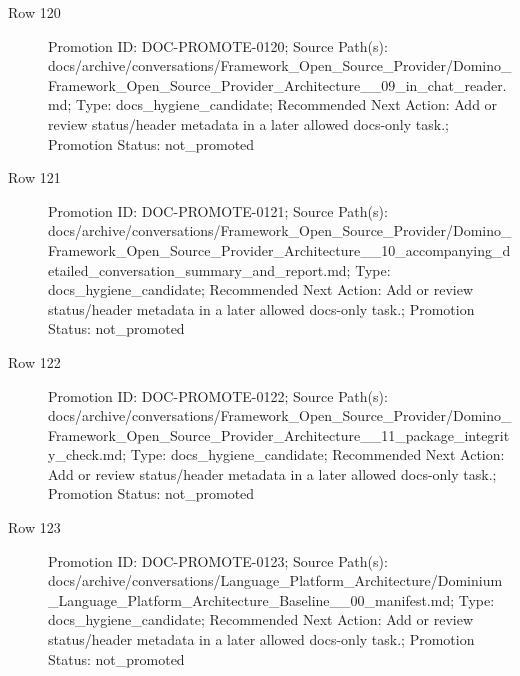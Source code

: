 \documentclass[9pt,a4paper,openany]{book}
\begin{document}
\begin{description}
\item[Row 120] Promotion ID: DOC-\allowbreak{}PROMOTE-\allowbreak{}0120; Source Path(s): docs/\allowbreak{}archive/\allowbreak{}conversations/\allowbreak{}Framework\_\allowbreak{}Open\_\allowbreak{}Source\_\allowbreak{}Provider/\allowbreak{}Domino\_\allowbreak{}Framework\_\allowbreak{}Open\_\allowbreak{}Source\_\allowbreak{}Provider\_\allowbreak{}Architecture\_\allowbreak{}\_\allowbreak{}09\_\allowbreak{}in\_\allowbreak{}chat\_\allowbreak{}reader.\allowbreak{}md; Type: docs\_\allowbreak{}hygiene\_\allowbreak{}candidate; Recommended Next Action: Add or review status/\allowbreak{}header metadata in a later allowed docs-\allowbreak{}only task.\allowbreak{}; Promotion Status: not\_\allowbreak{}promoted
\item[Row 121] Promotion ID: DOC-\allowbreak{}PROMOTE-\allowbreak{}0121; Source Path(s): docs/\allowbreak{}archive/\allowbreak{}conversations/\allowbreak{}Framework\_\allowbreak{}Open\_\allowbreak{}Source\_\allowbreak{}Provider/\allowbreak{}Domino\_\allowbreak{}Framework\_\allowbreak{}Open\_\allowbreak{}Source\_\allowbreak{}Provider\_\allowbreak{}Architecture\_\allowbreak{}\_\allowbreak{}10\_\allowbreak{}accompanying\_\allowbreak{}detailed\_\allowbreak{}conversation\_\allowbreak{}summary\_\allowbreak{}and\_\allowbreak{}report.\allowbreak{}md; Type: docs\_\allowbreak{}hygiene\_\allowbreak{}candidate; Recommended Next Action: Add or review status/\allowbreak{}header metadata in a later allowed docs-\allowbreak{}only task.\allowbreak{}; Promotion Status: not\_\allowbreak{}promoted
\item[Row 122] Promotion ID: DOC-\allowbreak{}PROMOTE-\allowbreak{}0122; Source Path(s): docs/\allowbreak{}archive/\allowbreak{}conversations/\allowbreak{}Framework\_\allowbreak{}Open\_\allowbreak{}Source\_\allowbreak{}Provider/\allowbreak{}Domino\_\allowbreak{}Framework\_\allowbreak{}Open\_\allowbreak{}Source\_\allowbreak{}Provider\_\allowbreak{}Architecture\_\allowbreak{}\_\allowbreak{}11\_\allowbreak{}package\_\allowbreak{}integrity\_\allowbreak{}check.\allowbreak{}md; Type: docs\_\allowbreak{}hygiene\_\allowbreak{}candidate; Recommended Next Action: Add or review status/\allowbreak{}header metadata in a later allowed docs-\allowbreak{}only task.\allowbreak{}; Promotion Status: not\_\allowbreak{}promoted
\item[Row 123] Promotion ID: DOC-\allowbreak{}PROMOTE-\allowbreak{}0123; Source Path(s): docs/\allowbreak{}archive/\allowbreak{}conversations/\allowbreak{}Language\_\allowbreak{}Platform\_\allowbreak{}Architecture/\allowbreak{}Dominium\_\allowbreak{}Language\_\allowbreak{}Platform\_\allowbreak{}Architecture\_\allowbreak{}Baseline\_\allowbreak{}\_\allowbreak{}00\_\allowbreak{}manifest.\allowbreak{}md; Type: docs\_\allowbreak{}hygiene\_\allowbreak{}candidate; Recommended Next Action: Add or review status/\allowbreak{}header metadata in a later allowed docs-\allowbreak{}only task.\allowbreak{}; Promotion Status: not\_\allowbreak{}promoted

\end{description}
\end{document}
